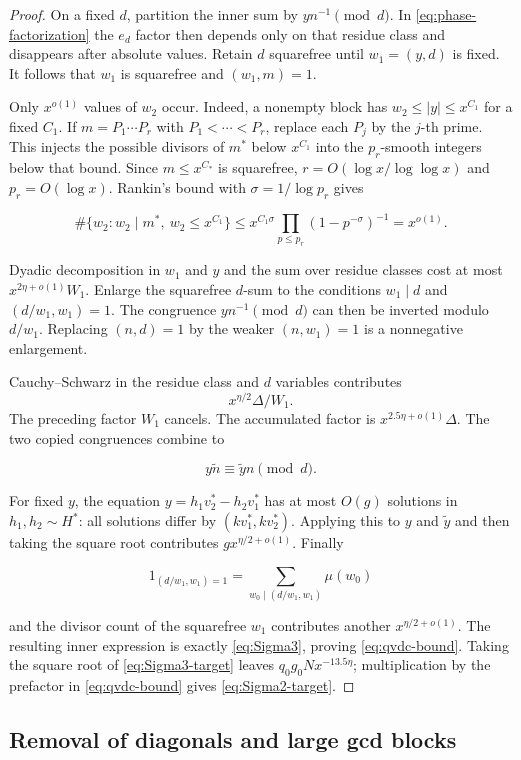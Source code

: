 \begin{proof}
On a fixed $d$, partition the inner sum by
$yn^{-1}\pmod d$.  In \cref{eq:phase-factorization} the $e_d$ factor then
depends only on that residue class and disappears after absolute values.
Retain $d$ squarefree until $w_1=(y,d)$ is fixed.  It follows that $w_1$ is
squarefree and $(w_1,m)=1$.

Only $x^{o(1)}$ values of $w_2$ occur.  Indeed, a nonempty block has
$w_2\le |y|\le x^{C_1}$ for a fixed $C_1$.  If
$m=P_1\cdots P_r$ with $P_1<\cdots<P_r$, replace each $P_j$ by the
$j$-th prime.  This injects the possible divisors of $m^*$ below $x^{C_1}$
into the $p_r$-smooth integers below that bound.  Since $m\le x^{C_*}$ is
squarefree, $r=O(\log x/\log\log x)$ and $p_r=O(\log x)$.  Rankin's
bound with $\sigma=1/\log p_r$ gives

\[
 \#\{w_2:w_2\mid m^*,\ w_2\le x^{C_1}\}
 \le x^{C_1\sigma}\prod_{p\le p_r}(1-p^{-\sigma})^{-1}
 =x^{o(1)}.
\]

Dyadic decomposition in $w_1$ and $y$ and the sum over residue classes cost
at most $x^{2\eta+o(1)}W_1$.  Enlarge the squarefree $d$-sum to the
conditions $w_1\mid d$ and $(d/w_1,w_1)=1$.  The congruence
$yn^{-1}\pmod d$ can then be inverted modulo $d/w_1$.  Replacing
$(n,d)=1$ by the weaker $(n,w_1)=1$ is a nonnegative enlargement.

Cauchy--Schwarz in the residue class and $d$ variables contributes
\[
 x^{\eta/2}\Delta/W_1.
\]
The preceding factor $W_1$ cancels.  The accumulated factor is
$x^{2.5\eta+o(1)}\Delta$.  The two copied
congruences combine to

\[
 y\widetilde n\equiv\widetilde yn\pmod d.
\]

For fixed $y$, the equation $y=h_1v_2^*-h_2v_1^*$ has at most $O(g)$
solutions in $h_1,h_2\sim H^*$: all solutions differ by
$(kv_1^*,kv_2^*)$.  Applying this to $y$ and $\widetilde y$ and then taking
the square root contributes $gx^{\eta/2+o(1)}$.  Finally

\[
 1_{(d/w_1,w_1)=1}
 =\sum_{w_0\mid(d/w_1,w_1)}\mu(w_0)
\]

and the divisor count of the squarefree $w_1$ contributes another
$x^{\eta/2+o(1)}$.  The resulting inner expression is exactly
\cref{eq:Sigma3}, proving \cref{eq:qvdc-bound}.  Taking the square root of
\cref{eq:Sigma3-target} leaves
$q_0g_0Nx^{-13.5\eta}$; multiplication by the prefactor in
\cref{eq:qvdc-bound} gives \cref{eq:Sigma2-target}.
\end{proof}

\subsection{Removal of diagonals and large gcd blocks}


